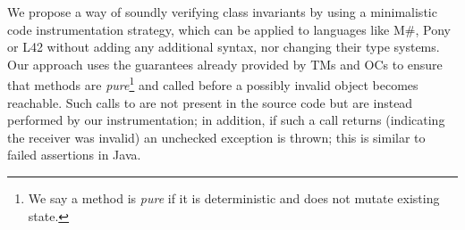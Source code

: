 






\LINE
We propose a way of soundly verifying class invariants by using a minimalistic code instrumentation strategy, which can be applied to languages like M\#, Pony or  L42  without adding any additional syntax, nor changing their type systems. Our approach uses the guarantees already provided by TMs and OCs to ensure that \Q@invariant@ methods are \emph{pure}\footnote{We say a method is \emph{pure} if it is deterministic and does not mutate existing state.} and called before a possibly invalid object becomes reachable. Such calls to \Q@invariant@ are not present in the source code but are instead performed by our instrumentation; in addition, if such a call returns \Q@false@ (indicating the receiver was invalid) an unchecked exception is thrown; this is similar to failed assertions in Java.


